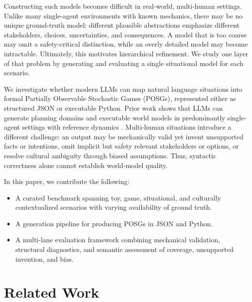 \documentclass{article}
\begin{document}
Constructing such models becomes difficult in real-world, multi-human settings. Unlike many single-agent environments with known mechanics, there may be no unique ground-truth model: different plausible abstractions emphasize different stakeholders, choices, uncertainties, and consequences. A model that is too coarse may omit a safety-critical distinction, while an overly detailed model may become intractable. Ultimately, this motivates hierarchical refinement. We study one layer of that problem by generating and evaluating a single situational model for each scenario.

We investigate whether modern LLMs can map natural language situations into formal Partially Observable Stochastic Games (POSGs), represented either as structured JSON or executable Python. Prior work shows that LLMs can generate planning domains and executable world models in predominantly single-agent settings with reference dynamics \citep{cao2025large,dainese2024generating}. Multi-human situations introduce a different challenge: an output may be mechanically valid yet invent unsupported facts or intentions, omit implicit but safety relevant stakeholders or options, or resolve cultural ambiguity through biased assumptions. Thus, syntactic correctness alone cannot establish world-model quality.

In this paper, we contribute the following:
\begin{itemize}
    \item A curated benchmark spanning toy, game, situational, and culturally contextualized scenarios with varying availability of ground truth.
    \item A generation pipeline for producing POSGs in JSON and Python.
    \item A multi-lane evaluation framework combining mechanical validation, structural diagnostics, and semantic assessment of coverage, unsupported invention, and bias.
\end{itemize}


\section{Related Work}
\label{sec:related_work}
\end{document}
